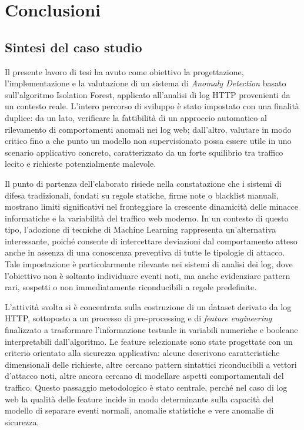 \chapter{Conclusioni}

\section{Sintesi del caso studio}

Il presente lavoro di tesi ha avuto come obiettivo la progettazione, l’implementazione e la valutazione di un sistema di \emph{Anomaly Detection} basato sull’algoritmo Isolation Forest, applicato all’analisi di log HTTP provenienti da un contesto reale. L’intero percorso di sviluppo è stato impostato con una finalità duplice: da un lato, verificare la fattibilità di un approccio automatico al rilevamento di comportamenti anomali nei log web; dall’altro, valutare in modo critico fino a che punto un modello non supervisionato possa essere utile in uno scenario applicativo concreto, caratterizzato da un forte squilibrio tra traffico lecito e richieste potenzialmente malevole.

Il punto di partenza dell’elaborato risiede nella constatazione che i sistemi di difesa tradizionali, fondati su regole statiche, firme note o blacklist manuali, mostrano limiti significativi nel fronteggiare la crescente dinamicità delle minacce informatiche e la variabilità del traffico web moderno. In un contesto di questo tipo, l’adozione di tecniche di Machine Learning rappresenta un’alternativa interessante, poiché consente di intercettare deviazioni dal comportamento atteso anche in assenza di una conoscenza preventiva di tutte le tipologie di attacco. Tale impostazione è particolarmente rilevante nei sistemi di analisi dei log, dove l’obiettivo non è soltanto individuare eventi noti, ma anche evidenziare pattern rari, sospetti o non immediatamente riconducibili a regole predefinite.

L’attività svolta si è concentrata sulla costruzione di un dataset derivato da log HTTP, sottoposto a un processo di pre-processing e di \emph{feature engineering} finalizzato a trasformare l’informazione testuale in variabili numeriche e booleane interpretabili dall’algoritmo. Le feature selezionate sono state progettate con un criterio orientato alla sicurezza applicativa: alcune descrivono caratteristiche dimensionali delle richieste, altre cercano pattern sintattici riconducibili a vettori d’attacco noti, altre ancora cercano di modellare aspetti comportamentali del traffico. Questo passaggio metodologico è stato centrale, perché nel caso di log web la qualità delle feature incide in modo determinante sulla capacità del modello di separare eventi normali, anomalie statistiche e vere anomalie di sicurezza.

